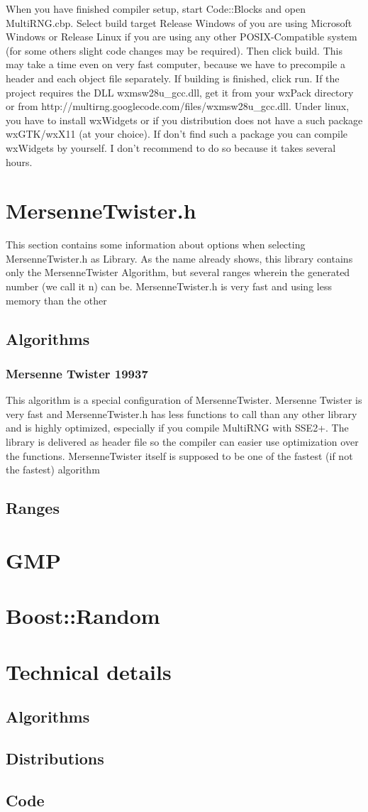 \documentclass{scrartcl}
\begin{document}
When you have finished compiler setup, start Code::Blocks and open MultiRNG.cbp. Select build target Release Windows of you are using Microsoft Windows or Release Linux if you are using any other POSIX-Compatible system (for some others slight code changes may be required). Then click build. This may take a time even on very fast computer, because we have to precompile a header and each object file separately. If building is finished, click run. If the project requires the DLL wxmsw28u\_gcc.dll, get it from your wxPack directory or from http://multirng.googlecode.com/files/wxmsw28u\_gcc.dll. Under linux, you have to install wxWidgets or if you distribution does not have a such package wxGTK/wxX11 (at your choice). If don't find such a package you can compile wxWidgets by yourself. I don't recommend to do so because it takes several hours.
\section{MersenneTwister.h}
This section contains some information about options when selecting MersenneTwister.h as Library.\newline
As the name already shows, this library contains only the MersenneTwister Algorithm, but several ranges wherein the generated number (we call it n) can be. MersenneTwister.h is very fast and using less memory than the other 
\subsection{Algorithms}
\subsubsection{Mersenne Twister 19937}
This algorithm is a special configuration of MersenneTwister. Mersenne Twister is very fast and MersenneTwister.h has less functions to call than any other library and is highly optimized, especially if you compile MultiRNG with SSE2+. The library is delivered as header file so the compiler can easier use optimization over the functions. MersenneTwister itself is supposed to be one of the fastest (if not the fastest) algorithm
\subsection{Ranges}
\section{GMP}
\section{Boost::Random}
\section{Technical details}
\subsection{Algorithms}

\subsection{Distributions}

\subsection{Code}
\end{document}
